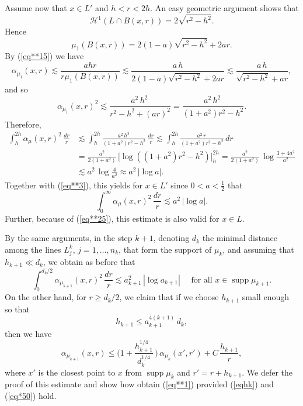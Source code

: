 \documentclass[11pt]{amsart}
\newcommand{\HH}{{\mathcal H}}
\newcommand{\rf}[1]{{(\ref{#1})}}
\newcommand{\supp}{\operatorname{supp}}
\newcommand{\vv}{{\vspace{2mm}}}
\theoremstyle{definition}
\theoremstyle{remark}
\numberwithin{equation}{section}
\begin{document}
Assume now that $x\in L'$ and $h<r<2h$. An easy geometric argument shows that 
$$\HH^1(L\cap B(x,r)) = 2\sqrt{r^2-h^2}.$$
Hence
$$\mu_1(B(x,r)) = 2(1-a)\sqrt{r^2-h^2} + 2ar.$$
By \rf{eq**15} we have
$$\alpha_{\mu_1}(x,r)\lesssim\frac{ahr}{r\mu_1(B(x,r))}\lesssim \frac{a\,h}{2(1-a)\sqrt{r^2-h^2} + 2ar}
\lesssim \frac{a\,h}{\sqrt{r^2-h^2} + ar},$$
and so
$$\alpha_{\mu_1}(x,r)^2\lesssim \frac{a^2\,h^2\,}{r^2-h^2 + (ar)^2} 
= \frac{a^2\,h^2\,}{(1+a^2)r^2-h^2 }
.$$
Therefore, 
\begin{align*}
\int_{h}^{2h} 
\alpha_\mu(x,r)^2\,\frac{dr}r &\lesssim 
\int_{h}^{2h}\frac{a^2\,h^2\,}{(1+a^2)r^2-h^2 }\,\frac{dr}r \lesssim
\int_{h}^{2h}\frac{a^2\,r\,}{(1+a^2)r^2-h^2 }\,dr\\
& = \frac{a^2}{2(1+a^2)}\,\biggl[\log((1+a^2)r^2-h^2)\biggr]_h^{2h} = 
\frac{a^2}{2(1+a^2)}\,\log \frac{3+4a^2}{a^2}\\
&\lesssim a^2\,\log\frac{4}{a^2}\approx a^2\,|\log a|
.
\end{align*} 
Together with \rf{eq**3}, this yields for $x\in L'$ since $0<a<\frac{1}{2}$ that
\begin{equation}\label{10.5A}
\int_{0}^\infty 
\alpha_\mu(x,r)^2\,\frac{dr}r\lesssim a^2\,|\log a|.
\end{equation}
Further, because of \rf{eq**25}, this estimate is also valid for $x\in L$.
\vv

By the same arguments, in the  step $k+1$, denoting 
$d_{k}$ the minimal distance among the lines $L_j^{k}$, $j=1,\ldots,n_{k}$, that form the support of $\mu_{k}$, and assuming that $h_{k+1}\ll d_k$,
 we obtain as before that
\begin{equation}\label{eq**5}
\int_0^{d_{k}/2}
\alpha_{\mu_{k+1}}(x,r)^2\,\frac{dr}r 
\lesssim a_{k+1}^2\,|\log a_{k+1}|\quad\mbox{ for all $x\in\supp\mu_{k+1}$.}
\end{equation}
On the other hand, for $r\geq d_k/2$, we claim that if we choose $h_{k+1}$ small enough so that
\begin{equation}\label{eqhk}
h_{k+1}\leq a_{k+1}^{4(k+1)}\,d_k,
\end{equation}
then we have
\begin{equation}\label{eq*50}
\alpha_{\mu_{k+1}}(x,r)\leq \biggl(1+ \frac{h_{k+1}^{1/4}}{d_k^{1/4}}\,\biggr)\,\alpha_{\mu_k}(x',r')
+ C\,\frac{h_{k+1}}r,
\end{equation}
where $x'$ is the closest point to $x$  from $\supp\mu_k$ and $r'=r+h_{k+1}$. We defer the proof of this estimate and
show how obtain \rf{eq**1} provided \rf{eqhk} and \rf{eq*50} hold.
\end{document}
